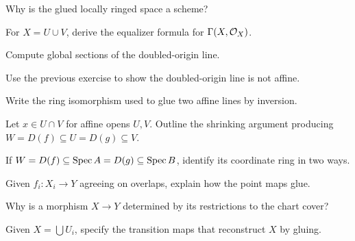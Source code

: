 \begin{exercise}\label{ex:vi20-12}
Why is the glued locally ringed space a scheme?
\end{exercise}

\begin{exercise}\label{ex:vi20-13}
For $X=U\cup V$, derive the equalizer formula for $\Gamma(X,\mathcal O_X)$.
\end{exercise}

\begin{exercise}\label{ex:vi20-14}
Compute global sections of the doubled-origin line.
\end{exercise}

\begin{exercise}\label{ex:vi20-15}
Use the previous exercise to show the doubled-origin line is not affine.
\end{exercise}

\begin{exercise}\label{ex:vi20-16}
Write the ring isomorphism used to glue two affine lines by inversion.
\end{exercise}

\begin{exercise}\label{ex:vi20-17}
Let $x\in U\cap V$ for affine opens $U,V$. Outline the shrinking argument producing $W=D(f)\subseteq U=D(g)\subseteq V$.
\end{exercise}

\begin{exercise}\label{ex:vi20-18}
If $W=D(f)\subseteq\operatorname{Spec} A=D(g)\subseteq\operatorname{Spec} B$, identify its coordinate ring in two ways.
\end{exercise}

\begin{exercise}\label{ex:vi20-19}
Given $f_i:X_i\to Y$ agreeing on overlaps, explain how the point maps glue.
\end{exercise}

\begin{exercise}\label{ex:vi20-20}
Why is a morphism $X\to Y$ determined by its restrictions to the chart cover?
\end{exercise}

\begin{exercise}\label{ex:vi20-21}
Given $X=\bigcup U_i$, specify the transition maps that reconstruct $X$ by gluing.
\end{exercise}

